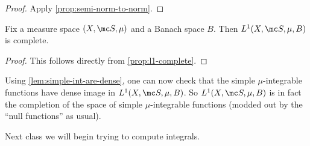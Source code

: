 \documentclass[../notes.tex]{subfiles}
\begin{document}
\begin{proof}
	Apply \autoref{prop:semi-norm-to-norm}.
\end{proof}
\begin{corollary} \label{cor:l1-complete}
	Fix a measure space $(X,\mc S,\mu)$ and a Banach space $B$. Then $L^1(X,\mc S,\mu,B)$ is complete.
\end{corollary}
\begin{proof}
	This follows directly from \autoref{prop:l1-complete}.
\end{proof}
\begin{remark}
	Using \autoref{lem:simple-int-are-dense}, one can now check that the simple $\mu$-integrable functions have dense image in $L^1(X,\mc S,\mu,B)$. So $L^1(X,\mc S,\mu,B)$ is in fact the completion of the space of simple $\mu$-integrable functions (modded out by the ``null functions'' as usual).
\end{remark}
Next class we will begin trying to compute integrals.
\end{document}
